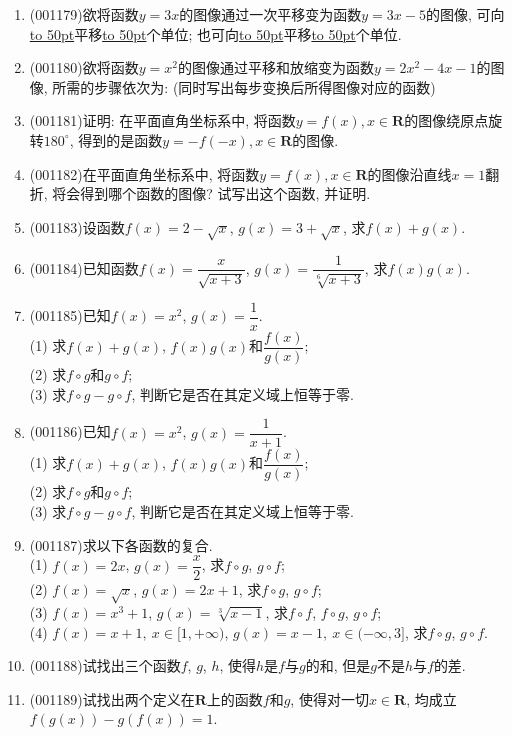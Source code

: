 \documentclass[10pt,a4paper]{article}
\newcommand{\blank}[1]{\underline{\hbox to #1pt{}}}
\begin{document}
\begin{enumerate}[1.]
(4) 向左平移$3$个单位, 然后将所得图像上的每一点的横坐标变为原来的$\dfrac{1}{2}$, 最后向下平移$2$个单位
\item {\tiny (001179)}欲将函数$y=3x$的图像通过一次平移变为函数$y=3x-5$的图像, 可向\blank{50}平移\blank{50}个单位; 也可向\blank{50}平移\blank{50}个单位.
\item {\tiny (001180)}欲将函数$y=x^2$的图像通过平移和放缩变为函数$y=2x^2-4x-1$的图像, 所需的步骤依次为: (同时写出每步变换后所得图像对应的函数)
\item {\tiny (001181)}证明: 在平面直角坐标系中, 将函数$y=f(x),x\in \mathbf{R}$的图像绕原点旋转$180^\circ$, 得到的是函数$y=-f(-x),x\in \mathbf{R}$的图像.
\item {\tiny (001182)}在平面直角坐标系中, 将函数$y=f(x),x\in \mathbf{R}$的图像沿直线$x=1$翻折, 将会得到哪个函数的图像? 试写出这个函数, 并证明.
\item {\tiny (001183)}设函数$f(x)=2-\sqrt{x}$, $g(x)=3+\sqrt{x}$, 求$f(x)+g(x)$.
\item {\tiny (001184)}已知函数$f(x)=\dfrac{x}{\sqrt{x+3}}$, $g(x)=\dfrac{1}{\sqrt[6]{x+3}}$, 求$f(x)g(x)$.
\item {\tiny (001185)}已知$f(x)=x^2$, $g(x)=\dfrac{1}{x}$.\\ 
(1) 求$f(x)+g(x)$, $f(x)g(x)$和$\dfrac{f(x)}{g(x)}$;\\ 
(2) 求$f\circ g$和$g\circ f$;\\ 
(3) 求$f\circ g-g\circ f$, 判断它是否在其定义域上恒等于零.
\item {\tiny (001186)}已知$f(x)=x^2$, $g(x)=\dfrac{1}{x+1}$.\\ 
(1) 求$f(x)+g(x)$, $f(x)g(x)$和$\dfrac{f(x)}{g(x)}$;\\ 
(2) 求$f\circ g$和$g\circ f$;\\ 
(3) 求$f\circ g-g\circ f$, 判断它是否在其定义域上恒等于零.
\item {\tiny (001187)}求以下各函数的复合.\\ 
(1) $f(x)=2x$, $g(x)=\dfrac{x}{2}$, 求$f\circ g$, $g\circ f$;\\ 
(2) $f(x)=\sqrt{x}$, $g(x)=2x+1$, 求$f\circ g$, $g\circ f$;\\ 
(3) $f(x)=x^3+1$, $g(x)=\sqrt[3]{x-1}$, 求$f\circ f$, $f\circ g$, $g\circ f$;\\ 
(4) $f(x)=x+1,\ x \in [1,+\infty)$, $g(x)=x-1, \  x \in (-\infty,3]$, 求$f\circ g$, $g\circ f$.
\item {\tiny (001188)}试找出三个函数$f$, $g$, $h$, 使得$h$是$f$与$g$的和, 但是$g$不是$h$与$f$的差.
\item {\tiny (001189)}试找出两个定义在$\mathbf{R}$上的函数$f$和$g$, 使得对一切$x\in \mathbf{R}$, 均成立$f(g(x))-g(f(x))=1$.

\end{enumerate}
\end{document}
